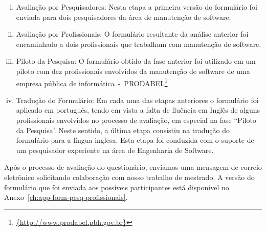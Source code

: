 \begin{enumerate}[(i)]
	\item Avaliação por Pesquisadores: Nesta etapa a primeira versão do
		formulário foi enviada para dois pesquisadores da área de manutenção de
		software.
	\item Avaliação por Profissionais: O formulário resultante da análise
		anterior foi encaminhado a dois profissionais que trabalham com
		manutenção de software.
	\item Piloto da Pesquisa: O formulário obtido da fase anterior foi utilizado
		em um piloto com dez profissionais envolvidos da manutenção de software
		de uma empresa pública de
		informática~-~PRODABEL\footnote{\url{{http://www.prodabel.pbh.gov.br}}}
	\item Tradução do Formulário: Em cada uma das etapas anteriores o
		formulário foi aplicado em português, tendo em vista a falta de fluência
		em Inglês de alguns profissionais envolvidos no processo de avaliação,
		em especial na fase ``Piloto da Pesquisa'. Neste sentido, a última etapa
		consistiu na tradução do formulário para a língua inglesa. Esta etapa
		foi conduzida com  o suporte de um pesquisador experiente na área de
		Engenharia de Software.
\end{enumerate}

Após o processo de avaliação do questionário, enviamos uma mensagem de correio
eletrônico solicitando colaboração com nosso trabalho de mestrado. A versão do
formulário que foi enviada aos possíveis participantes está disponível no
Anexo~\ref{ch:app-form-pesq-profissionais}.



